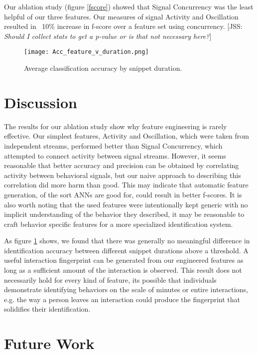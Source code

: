 \documentclass[conference]{IEEEtran}
\newcommand{\meta}[1]{{\textcolor[rgb]{0.1,0.7,0.2}{[JSS: {\it #1}]}}}
\begin{document}
Our ablation study (figure \ref{fscore}) showed that Signal Concurrency was the least helpful of our three features. Our measures of signal Activity and Oscillation resulted in ~10\% increase in f-score over a feature set using concurrency. \meta{Should I collect stats to get a p-value or is that not necessary here?}

\begin{figure}[h]
    \caption{Average classification accuracy by snippet duration.}
    \centering
    \texttt{[image: Acc\_feature\_v\_duration.png]}
    \label{acc_snippet}
\end{figure}

\section{Discussion}

The results for our ablation study show why feature engineering is rarely effective. Our simplest features, Activity and Oscillation, which were taken from independent streams, performed better than Signal Concurrency, which attempted to connect activity between signal streams. However, it seems reasonable that better accuracy and precision can be obtained by correlating activity between behavioral signals, but our naive approach to describing this correlation did more harm than good. This may indicate that automatic feature generation, of the sort ANNs are good for, could result in better f-scores. It is also worth noting that the used features were intentionally kept generic with no implicit understanding of the behavior they described, it may be reasonable to craft behavior specific features for a more specialized identification system. 

As figure \ref{acc_snippet} shows, we found that there was generally no meaningful difference in identification accuracy between different snippet durations above a threshold. A useful interaction fingerprint can be generated from our engineered features as long as a sufficient amount of the interaction is observed. This result does not necessarily hold for every kind of feature, its possible that individuals demonstrate identifying behaviors on the scale of minutes or entire interactions, e.g. the way a person leaves an interaction could produce the fingerprint that solidifies their identification. 

\section{Future Work}
\end{document}
